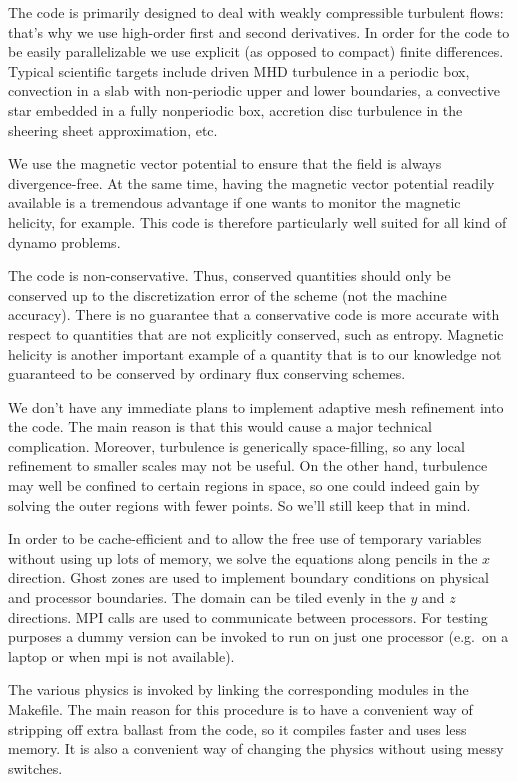 \documentclass[12pt,twoside,notitlepage,a4paper]{article}
\begin{document}
The code is primarily designed to deal with weakly compressible turbulent
flows: that's why we use high-order first and second derivatives.
In order for the code to be easily parallelizable we use explicit
(as opposed to compact) finite differences.
Typical scientific targets include driven MHD turbulence in a periodic box,
convection in a slab with non-periodic upper and lower boundaries,
a convective star embedded in a fully nonperiodic box, accretion disc turbulence in
the sheering sheet approximation, etc.

We use the magnetic vector potential to ensure that the field
is always divergence-free. At the same time, having the magnetic
vector potential readily available is a tremendous advantage if
one wants to monitor the magnetic helicity, for example.
This code is therefore particularly well suited for all kind of
dynamo problems.

The code is non-conservative. Thus, conserved quantities should only be
conserved up to the discretization error of the scheme (not the machine accuracy).
There is no guarantee that a conservative code is more accurate with
respect to quantities that are not explicitly conserved, such as entropy.
Magnetic helicity is another important example of a quantity that is to
our knowledge not guaranteed to be conserved by ordinary flux conserving
schemes.

We don't have any immediate plans to implement adaptive mesh refinement
into the code. The main reason is that this would cause a major technical
complication. Moreover, turbulence is generically space-filling, so any
local refinement to smaller scales may not be useful. On the other hand,
turbulence may well be confined to certain regions in space, so one
could indeed gain by solving the outer regions with fewer points.
So we'll still keep that in mind.

In order to be cache-efficient and to allow the free use of temporary
variables without using up lots of memory, we solve the equations along
pencils in the $x$ direction. Ghost zones are used to implement boundary
conditions on physical and processor boundaries. The domain can be tiled
evenly in the $y$ and $z$ directions. MPI calls are used to communicate
between processors. For testing purposes a dummy version can be invoked
to run on just one processor (e.g.\ on a laptop or when mpi is not available).

The various physics is invoked by linking the corresponding modules in the
Makefile. The main reason for this procedure is to have a convenient way
of stripping off extra ballast from the code, so it compiles faster and
uses less memory. It is also a convenient way of changing the physics
without using messy switches.
\end{document}
